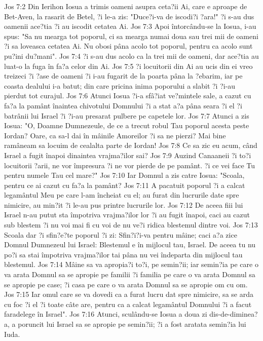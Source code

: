 Jos 7:2  Din Ierihon Iosua a trimis oameni asupra ceta?ii Ai, care e aproape de Bet-Aven, la rasarit de Betel, ?i le-a zis: "Duce?i-va de iscodi?i ?ara!" ?i s-au dus oamenii ace?tia ?i au iscodit cetatea Ai.
Jos 7:3  Apoi întorcându-se la Iosua, i-au spus: "Sa nu mearga tot poporul, ci sa mearga numai doua sau trei mii de oameni ?i sa loveasca cetatea Ai. Nu obosi pâna acolo tot poporul, pentru ca acolo sunt pu?ini du?mani".
Jos 7:4  ?i s-au dus acolo ca la trei mii de oameni, dar ace?tia au luat-o la fuga în fa?a celor din Ai.
Jos 7:5  ?i locuitorii din Ai au ucis din ei vreo treizeci ?i ?ase de oameni ?i i-au fugarit de la poarta pâna la ?ebarim, iar pe coasta dealului i-a batut; din care pricina inima poporului a slabit ?i ?i-au pierdut tot curajul.
Jos 7:6  Atunci Iosua ?i-a sfâ?iat ve?mintele sale, a cazut cu fa?a la pamânt înaintea chivotului Domnului ?i a stat a?a pâna seara ?i el ?i batrânii lui Israel ?i ?i-au presarat pulbere pe capetele lor.
Jos 7:7  Atunci a zis Iosua: "O, Doamne Dumnezeule, de ce a trecut robul Tau poporul acesta peste Iordan? Oare, ca sa-l dai în mâinile Amoreilor ?i sa ne pierzi? Mai bine ramâneam sa locuim de cealalta parte de Iordan!
Jos 7:8  Ce sa zic eu acum, când Israel a fugit înapoi dinaintea vrajma?ilor sai?
Jos 7:9  Auzind Canaaneii ?i to?i locuitorii ?arii, ne vor împresura ?i ne vor pierde de pe pamânt. ?i ce vei face Tu pentru numele Tau cel mare?"
Jos 7:10  Iar Domnul a zis catre Iosua: "Scoala, pentru ce ai cazut cu fa?a la pamânt?
Jos 7:11  A pacatuit poporul ?i a calcat legamântul Meu pe care l-am încheiat cu el; au furat din lucrurile date spre nimicire, au min?it ?i le-au pus printre lucrurile lor.
Jos 7:12  De aceea fiii lui Israel n-au putut sta împotriva vrajma?ilor lor ?i au fugit înapoi, caci au cazut sub blestem ?i nu voi mai fi cu voi de nu ve?i ridica blestemul dintre voi.
Jos 7:13  Scoala dar ?i sfin?e?te poporul ?i zi: Sfin?i?i-va pentru mâine; caci a?a zice Domnul Dumnezeul lui Israel: Blestemul e în mijlocul tau, Israel. De aceea tu nu po?i sa stai împotriva vrajma?ilor tai pâna nu vei îndeparta din mijlocul tau blestemul.
Jos 7:14  Mâine sa va apropia?i to?i, pe semin?ii; iar semin?ia pe care o va arata Domnul sa se apropie pe familii ?i familia pe care o va arata Domnul sa se apropie pe case; ?i casa pe care o va arata Domnul sa se apropie om cu om.
Jos 7:15  Iar omul care se va dovedi ca a furat lucru dat spre nimicire, sa se arda cu foc ?i el ?i toate câte are, pentru ca a calcat legamântul Domnului ?i a facut faradelege în Israel".
Jos 7:16  Atunci, sculându-se Iosua a doua zi dis-de-diminea?a, a poruncit lui Israel sa se apropie pe semin?ii; ?i a fost aratata semin?ia lui Iuda.
